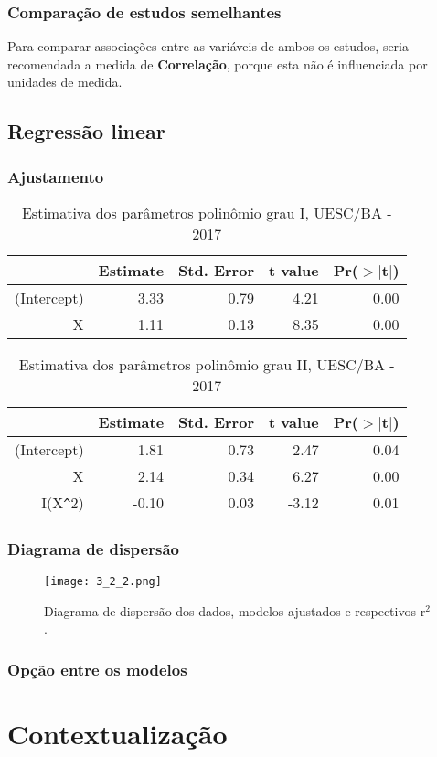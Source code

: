 \documentclass[a4paper, 10pt]{article}
\begin{document}
			\subsubsection{Comparação de estudos semelhantes}
				Para comparar associações entre as variáveis de ambos os estudos, seria recomendada a medida de \textbf{Correlação}, porque esta não é influenciada por unidades de medida.
		\subsection{Regressão linear}
			\subsubsection{Ajustamento}
				\begin{table}[!htb]
					\caption{Estimativa dos parâmetros polinômio grau I, UESC/BA - 2017}
					\begin{tabular}{rrrrr}
						\hline
						& Estimate & Std. Error & t value & Pr($>|$t$|$)  \\
						\hline
						(Intercept) & 3.33 & 0.79 & 4.21 & 0.00 \\
								X &	1.11 & 0.13 & 8.35 & 0.00 \\
						\hline
					\end{tabular}
				\end{table}
				\begin{table}[!htb]
					\caption{Estimativa dos parâmetros polinômio grau II, UESC/BA - 2017}
					\begin{tabular}{rrrrr}
						\hline
						& Estimate & Std. Error & t value & Pr($>|$t$|$) \\ 
						\hline
						(Intercept) & 1.81 & 0.73 & 2.47 & 0.04 \\ 
						X & 2.14 & 0.34 & 6.27 & 0.00 \\ 
						I(X\verb|^|2) & -0.10 & 0.03 & -3.12 & 0.01 \\ 
						\hline
					\end{tabular}
				\end{table}
			\subsubsection{Diagrama de dispersão}
				\begin{figure}[!htb]
				\centering
					\texttt{[image: 3\_2\_2.png]}
					\caption{Diagrama de dispersão dos dados, modelos ajustados e respectivos r$^{2}$.}
				\end{figure}
			\subsubsection{Opção entre os modelos}	
	\section{Contextualização}
\end{document}
